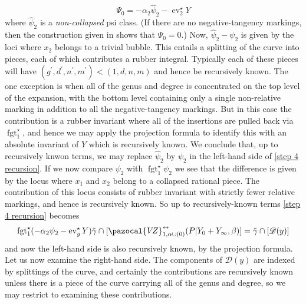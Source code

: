 \documentclass[11pt]{amsart}
\newcommand{\VZ}{\pazocal{V\!Z}}
\newcommand{\st}{\star}
\newcommand{\ev}{\operatorname{ev}}
\newcommand{\fgt}{\operatorname{fgt}}
\newcommand{\Dcal}{\mathcal{D}}
\theoremstyle{definition}
\theoremstyle{definition}
\begin{document}
\begin{equation*}\label{Psi0 formula} \Psi_0 = -\alpha_2 \hat\psi_2 - \ev_2^\st Y \end{equation*}
where $\hat\psi_2$ is a \emph{non-collapsed} psi class. (If there are no negative-tangency markings, then the construction given in \cite[\S 1.5.2]{MaulikPandharipande} shows that $\Psi_0=0$.) Now, $\hat\psi_2 - \psi_2$ is given by the loci where $x_2$ belongs to a trivial bubble. This entails a splitting of the curve into pieces, each of which contributes a rubber integral. Typically each of these pieces will have $(g^\prime,d^\prime,n^\prime,m^\prime) < (1,d,n,m)$ and hence be recursively known. The one exception is when all of the genus and degree is concentrated on the top level of the expansion, with the bottom level containing only a single non-relative marking in addition to all the negative-tangency markings. But in this case the contribution is a rubber invariant where all of the insertions are pulled back via $\fgt_1^\st$, and hence we may apply the projection formula to identify this with an absolute invariant of $Y$ which is recursively known. We conclude that, up to recursively knwon terms, we may replace $\hat\psi_2$ by $\psi_2$ in the left-hand side of \eqref{step 4 recursion}. If we now compare $\psi_2$ with $\fgt_1^\st \psi_2$ we see that the difference is given by the locus where $x_1$ and $x_2$ belong to a collapsed rational piece. The contribution of this locus consists of rubber invariant with strictly fewer relative markings, and hence is recursively known. So up to recursively-known terms \eqref{step 4 recursion} becomes
\begin{equation*} \fgt_1^\st (-\alpha_2\psi_2 - \ev_y^\st Y)\tilde\gamma \cap [\VZ^{\leftrightarrow}_{1,\alpha\cup(0)}(P|Y_0+Y_\infty,\beta)] = \tilde\gamma\cap[\Dcal(y)]\end{equation*}
and now the left-hand side is also recursively known, by the projection formula. Let us now examine the right-hand side. The components of $\Dcal(y)$ are indexed by splittings of the curve, and certainly the contributions are recursively known unless there is a piece of the curve carrying all of the genus and degree, so we may restrict to examining these contributions.
\end{document}
